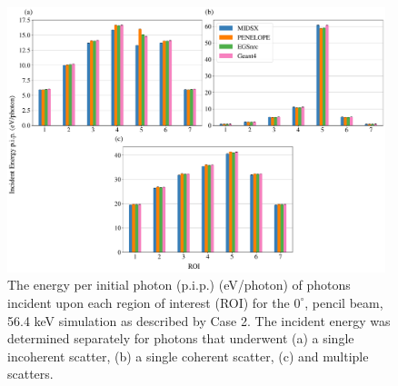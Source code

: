 \FloatBarrier



\begin{figure}[htpb]
    \centering
	\includegraphics[width=0.98\textwidth]{../figures/ROI_0_deg_pencil_paper_ready.pdf}
	\caption{The energy per initial photon (p.i.p.) (eV/photon) of photons incident upon each region of interest (ROI) for the $0^\circ$, pencil beam, 56.4 keV simulation as described by Case 2. The incident energy was determined separately for photons that underwent (a) a single incoherent scatter, (b) a single coherent scatter, (c) and multiple scatters.}
	\label{fig:ROIPGraph}
\end{figure}



